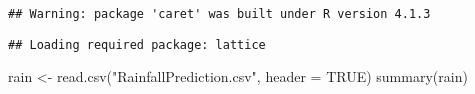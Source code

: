 \documentclass[
]{article}
\newenvironment{Shaded}{\begin{snugshade}}{\end{snugshade}}
\newcommand{\AttributeTok}[1]{\textcolor[rgb]{0.77,0.63,0.00}{#1}}
\newcommand{\ConstantTok}[1]{\textcolor[rgb]{0.00,0.00,0.00}{#1}}
\newcommand{\FunctionTok}[1]{\textcolor[rgb]{0.00,0.00,0.00}{#1}}
\newcommand{\NormalTok}[1]{#1}
\newcommand{\OtherTok}[1]{\textcolor[rgb]{0.56,0.35,0.01}{#1}}
\newcommand{\StringTok}[1]{\textcolor[rgb]{0.31,0.60,0.02}{#1}}
\begin{document}
\begin{verbatim}
## Warning: package 'caret' was built under R version 4.1.3
\end{verbatim}

\begin{verbatim}
## Loading required package: lattice
\end{verbatim}

\begin{Shaded}
\begin{Highlighting}[]
\NormalTok{rain }\OtherTok{\textless{}{-}} \FunctionTok{read.csv}\NormalTok{(}\StringTok{"RainfallPrediction.csv"}\NormalTok{, }\AttributeTok{header =} \ConstantTok{TRUE}\NormalTok{)}
\FunctionTok{summary}\NormalTok{(rain)}
\end{Highlighting}
\end{Shaded}
\end{document}
